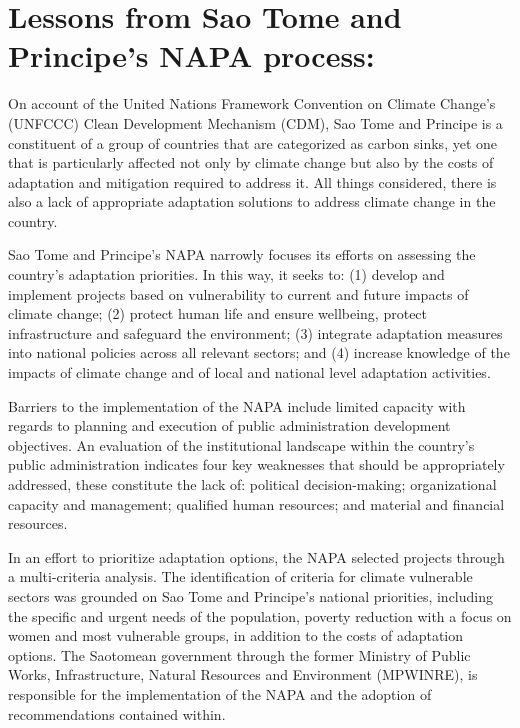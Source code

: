 \documentclass[
]{book}
\begin{document}
\hypertarget{lessons-from-sao-tome-and-principes-napa-process}{%
\section{Lessons from Sao Tome and Principe's NAPA process:}\label{lessons-from-sao-tome-and-principes-napa-process}}

On account of the United Nations Framework Convention on Climate Change's (UNFCCC) Clean Development Mechanism (CDM), Sao Tome and Principe is a constituent of a group of countries that are categorized as carbon sinks, yet one that is particularly affected not only by climate change but also by the costs of adaptation and mitigation required to address it. All things considered, there is also a lack of appropriate adaptation solutions to address climate change in the country.

Sao Tome and Principe's NAPA narrowly focuses its efforts on assessing the country's adaptation priorities. In this way, it seeks to: (1) develop and implement projects based on vulnerability to current and future impacts of climate change; (2) protect human life and ensure wellbeing, protect infrastructure and safeguard the environment; (3) integrate adaptation measures into national policies across all relevant sectors; and (4) increase knowledge of the impacts of climate change and of local and national level adaptation activities.

Barriers to the implementation of the NAPA include limited capacity with regards to planning and execution of public administration development objectives. An evaluation of the institutional landscape within the country's public administration indicates four key weaknesses that should be appropriately addressed, these constitute the lack of: political decision-making; organizational capacity and management; qualified human resources; and material and financial resources.

In an effort to prioritize adaptation options, the NAPA selected projects through a multi-criteria analysis. The identification of criteria for climate vulnerable sectors was grounded on Sao Tome and Principe's national priorities, including the specific and urgent needs of the population, poverty reduction with a focus on women and most vulnerable groups, in addition to the costs of adaptation options. The Saotomean government through the former Ministry of Public Works, Infrastructure, Natural Resources and Environment (MPWINRE), is responsible for the implementation of the NAPA and the adoption of recommendations contained within.
\end{document}
